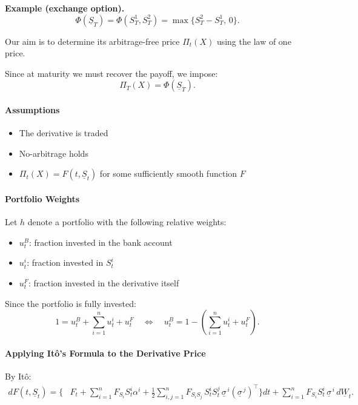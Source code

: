 \documentclass[12pt,a4paper]{article}
\theoremstyle{definition}
\begin{document}
\textbf{Example (exchange option).}
\[
\Phi(\underline{S}_T) = \Phi(S_T^1, S_T^2) = \max\{S_T^2 - S_T^1, \, 0\}.
\]

Our aim is to determine its arbitrage-free price $\Pi_t(X)$ using the law of one price.

Since at maturity we must recover the payoff, we impose:
\[
\Pi_T(X) = \Phi(\underline{S}_T).
\]

\paragraph{Assumptions}

\begin{itemize}
\item The derivative is traded
\item No-arbitrage holds
\item $\Pi_t(X) = F(t, \underline{S}_t)$ for some sufficiently smooth function $F$
\end{itemize}

\paragraph{Portfolio Weights}

Let $h$ denote a portfolio with the following relative weights:
\begin{itemize}
\item $u_t^B$: fraction invested in the bank account
\item $u_t^i$: fraction invested in $S_t^i$
\item $u_t^F$: fraction invested in the derivative itself
\end{itemize}

Since the portfolio is fully invested:
\[
1 = u_t^B + \sum_{i=1}^n u_t^i + u_t^F \quad \Longleftrightarrow \quad u_t^B = 1 - \left(\sum_{i=1}^n u_t^i + u_t^F\right).
\]

\paragraph{Applying Itô's Formula to the Derivative Price}

By Itô:
\[
\begin{aligned}
dF(t, \underline{S}_t) = \Bigg\{ & F_t + \sum_{i=1}^n F_{S_i} S_t^i \alpha^i + \frac{1}{2} \sum_{i,j=1}^n F_{S_i S_j} \, S_t^i S_t^j \, \underline{\sigma}^{\,i} (\underline{\sigma}^{\,j})^\top \Bigg\} dt + \sum_{i=1}^n F_{S_i} S_t^i \, \underline{\sigma}^{\,i} \, d\underline{W}_t.
\end{aligned}
\]
\end{document}
